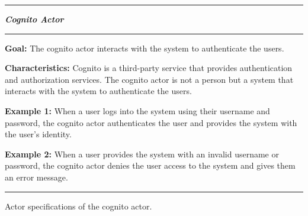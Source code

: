 \begin{table}[H]
    \noindent
    \rule{\textwidth}{0.4pt}

    \begin{center}
        \noindent
        \textit{\textbf{Cognito Actor}}
    \end{center}

    \noindent
    \rule{\textwidth}{0.4pt}
    \noindent

    \textbf{Goal:} The cognito actor interacts with the system to authenticate the users.
    \newline
    \noindent

    \textbf{Characteristics:} Cognito is a third-party service that provides authentication and authorization services.
    The cognito actor is not a person but a system that interacts with the system to authenticate the users.
    \newline
    \noindent

    \textbf{Example 1:} When a user logs into the system using their username and password, the cognito actor
    authenticates the user and provides the system with the user's identity.
    \newline
    \noindent

    \textbf{Example 2:} When a user provides the system with an invalid username or password, the cognito actor
    denies the user access to the system and gives them an error message.

    \noindent
    \rule{\textwidth}{0.4pt}
    \caption{Actor specifications of the cognito actor.
    }\label{tab:actor-cognito}
\end{table}
